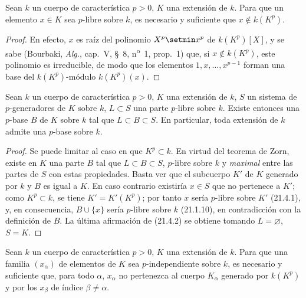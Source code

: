 \begin{lemma}[21.4.1]
\label{0.21.4.1-fr}
Sean $k$ un cuerpo de característica $p>0$, $K$ una extensión de $k$. Para
que un elemento $x\in K$ sea $p$-libre sobre $k$, es necesario y suficiente
que $x\notin k(K^p)$.
\end{lemma}


\begin{proof}
En efecto, $x$ es raíz del polinomio $X^p\setmin x^p$ de $k(K^p)[X]$, y se sabe
(Bourbaki, \emph{Alg.}, cap.~V, §~8, n\textsuperscript{o}~1, prop.~1) que, si
$x\notin k(K^p)$, este polinomio es irreducible, de modo que los elementos
$1,x,\ldots,x^{p-1}$ forman una base del $k(K^p)$-módulo $k(K^p)(x)$.
\end{proof}

\begin{theorem}[21.4.2]
\label{0.21.4.2-fr}
Sean $k$ un cuerpo de característica $p>0$, $K$ una extensión de $k$,
$S$ un sistema de $p$-generadores de $K$ sobre $k$, $L\subset S$ una parte
$p$-libre sobre $k$. Existe entonces una $p$-base $B$ de $K$ sobre $k$ tal que
$L\subset B\subset S$. En particular, toda extensión de $k$ admite una
$p$-base sobre $k$.
\end{theorem}

\begin{proof}
Se puede limitar al caso en que $K^p\subset k$. En virtud del teorema de
Zorn, existe en $K$ una parte $B$ tal que $L\subset B\subset S$, $p$-libre
sobre $k$ y \emph{maximal} entre las partes de $S$ con estas propiedades. Basta ver
que el subcuerpo $K'$ de $K$ generado por $k$ y $B$ es igual a $K$.
En caso contrario existiría $x\in S$ que no pertenece a $K'$; como
$K^p\subset k$, se tiene $K'=K'(K^p)$; por tanto $x$ sería $p$-libre sobre
$K'$ (21.4.1), y, en consecuencia, $B\cup\{x\}$ sería $p$-libre sobre $k$
(21.1.10), en contradicción con la definición de $B$. La última afirmación de
(21.4.2) se obtiene tomando $L=\varnothing$, $S=K$.
\end{proof}

\begin{corollary}[21.4.3]
\label{0.21.4.3-fr}
Sean $k$ un cuerpo de característica $p>0$, $K$ una extensión de $k$.
Para que una familia $(x_\alpha)$ de elementos de $K$ sea $p$-independiente sobre $k$,
es necesario y suficiente que, para todo $\alpha$, $x_\alpha$ no pertenezca al
cuerpo $K_\alpha$ generado por $k(K^p)$ y por los $x_\beta$ de índice
$\beta\neq\alpha$.
\end{corollary}

